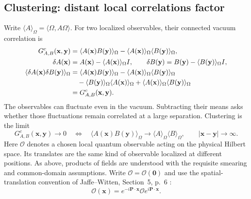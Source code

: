 \subsection{Clustering: distant local correlations factor}
\label{qft:sec:clustering}
Write $\langle A\rangle_\Omega=\langle\Omega,A\Omega\rangle$.
For two localized observables, their connected vacuum correlation is
\begin{align}
 G^c_{A,B}(\mathbf x,\mathbf y)
 &=\langle A(\mathbf x)B(\mathbf y)\rangle_\Omega
    -\langle A(\mathbf x)\rangle_\Omega
     \langle B(\mathbf y)\rangle_\Omega,\notag\\
 \delta A(\mathbf x)&=A(\mathbf x)-\langle A(\mathbf x)\rangle_\Omega I,
 \qquad
 \delta B(\mathbf y)=B(\mathbf y)-\langle B(\mathbf y)\rangle_\Omega I,
 \notag\\
 \langle\delta A(\mathbf x)\delta B(\mathbf y)\rangle_\Omega
 &=\langle A(\mathbf x)B(\mathbf y)\rangle_\Omega
  -\langle A(\mathbf x)\rangle_\Omega\langle B(\mathbf y)\rangle_\Omega
  \notag\\
 &\quad-\langle B(\mathbf y)\rangle_\Omega\langle A(\mathbf x)\rangle_\Omega
  +\langle A(\mathbf x)\rangle_\Omega\langle B(\mathbf y)\rangle_\Omega
 \notag\\
 &=G^c_{A,B}(\mathbf x,\mathbf y).
 \label{qft:connected-spatial-correlation}
\end{align}
The observables can fluctuate even in the vacuum. Subtracting their means
asks whether those fluctuations remain correlated at a large separation.
Clustering is the limit
\begin{equation}\label{qft:clustering-factorization}
 G^c_{A,B}(\mathbf x,\mathbf y)\longrightarrow0
 \quad\Longleftrightarrow\quad
 \langle A(\mathbf x)B(\mathbf y)\rangle_\Omega
 \longrightarrow\langle A\rangle_\Omega\langle B\rangle_\Omega,
 \qquad |\mathbf x-\mathbf y|\longrightarrow\infty.
\end{equation}
Here $\mathcal O$ denotes a chosen local quantum observable acting on the
physical Hilbert space. Its translates are the same kind of observable
localized at different positions. As above, products of fields are
understood with the requisite smearing and common-domain assumptions.
Write $\mathcal O=\mathcal O(\mathbf0)$ and use the spatial-translation
convention of Jaffe--Witten, Section~5, p.~6 \cite{JaffeWitten2006}:
\begin{equation}\label{qft:local-observable-translation}
 \mathcal O(\mathbf x)
 =e^{-i\mathbf P\cdot\mathbf x}\mathcal O
  e^{i\mathbf P\cdot\mathbf x}.
\end{equation}
